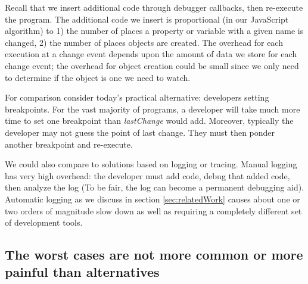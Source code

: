 \documentclass{sig-alternate}
\begin{document}
Recall that we
insert additional code through debugger callbacks, then re-execute the
program. The additional code we insert is proportional (in our
JavaScript algorithm) to 1) the number of places a property or
variable with a given name is changed, 2) the number of places objects
are created. The overhead for each execution at a change event
 depends upon the amount of data we store for each change event; 
the overhead for object creation could be small since we only need to 
determine if the object is one we need to watch.  


For comparison consider today's practical alternative: developers
setting breakpoints. For the vast majority of programs, a developer
will take much more time to set one breakpoint than
\textit{lastChange} would add. Moreover, typically the developer may not
guess the point of last change. They must then ponder another
breakpoint and re-execute. 


We could also compare to solutions based on logging or tracing. Manual
logging has very high overhead: the developer must add code, debug
that added code, then analyze the log (To be fair, the log can become
a permanent debugging aid). Automatic logging as we discuss in 
section \ref{sec:relatedWork} causes about one or two orders of magnitude slow down as well
as requiring a completely different set of development tools. 

\subsection{The worst cases are not more common or more painful than alternatives}
\end{document}
